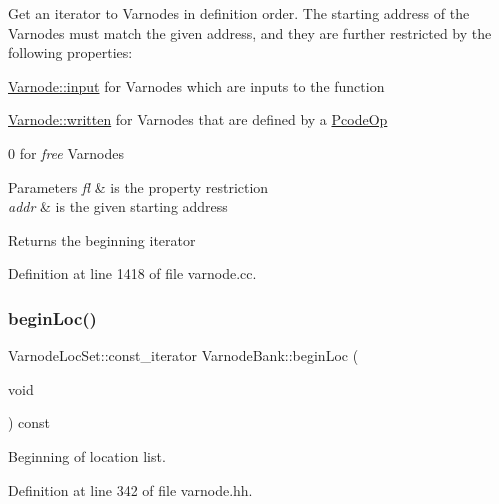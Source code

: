 Get an iterator to Varnodes in definition order. The starting address of the Varnodes must match the given address, and they are further restricted by the following properties\+:
\begin{DoxyItemize}
\item \mbox{\hyperlink{class_varnode_ad367c0ac3c08b6f41e7334e90a138e8ca9c9363556459d8828a5ab58c370ccd2e}{Varnode\+::input}} for Varnodes which are inputs to the function
\item \mbox{\hyperlink{class_varnode_ad367c0ac3c08b6f41e7334e90a138e8ca16c6748ecb7542c2f79d81be83098dd5}{Varnode\+::written}} for Varnodes that are defined by a \mbox{\hyperlink{class_pcode_op}{Pcode\+Op}}
\item 0 for {\itshape free} Varnodes 
\begin{DoxyParams}{Parameters}
{\em fl} & is the property restriction \\
\hline
{\em addr} & is the given starting address \\
\hline
\end{DoxyParams}
\begin{DoxyReturn}{Returns}
the beginning iterator 
\end{DoxyReturn}

\end{DoxyItemize}

Definition at line 1418 of file varnode.\+cc.

\mbox{\label{class_varnode_bank_adbb6ea3ddaec68864cb408ad45eeb66d}} 
\subsubsection{\texorpdfstring{beginLoc()}{beginLoc()}\hspace{0.1cm}{\footnotesize\ttfamily [1/6]}}
{\footnotesize\ttfamily Varnode\+Loc\+Set\+::const\+\_\+iterator Varnode\+Bank\+::begin\+Loc (\begin{DoxyParamCaption}\item[{void}]{ }\end{DoxyParamCaption}) const\hspace{0.3cm}{\ttfamily [inline]}}



Beginning of location list. 



Definition at line 342 of file varnode.\+hh.

